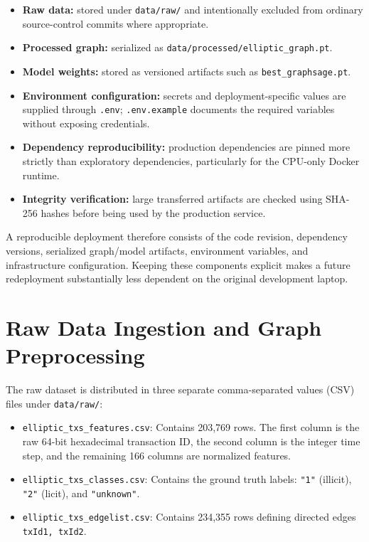 \documentclass[11pt,a4paper]{report}
\begin{document}
\begin{itemize}[leftmargin=1.5em]
  \item \textbf{Raw data:} stored under \texttt{data/raw/} and intentionally excluded from ordinary source-control commits where appropriate.
  \item \textbf{Processed graph:} serialized as \texttt{data/processed/elliptic\_graph.pt}.
  \item \textbf{Model weights:} stored as versioned artifacts such as \texttt{best\_graphsage.pt}.
  \item \textbf{Environment configuration:} secrets and deployment-specific values are supplied through \texttt{.env}; \texttt{.env.example} documents the required variables without exposing credentials.
  \item \textbf{Dependency reproducibility:} production dependencies are pinned more strictly than exploratory dependencies, particularly for the CPU-only Docker runtime.
  \item \textbf{Integrity verification:} large transferred artifacts are checked using SHA-256 hashes before being used by the production service.
\end{itemize}

A reproducible deployment therefore consists of the code revision, dependency versions, serialized graph/model artifacts, environment variables, and infrastructure configuration. Keeping these components explicit makes a future redeployment substantially less dependent on the original development laptop.

\section{Raw Data Ingestion and Graph Preprocessing}
The raw dataset is distributed in three separate comma-separated values (CSV) files under \texttt{data/raw/}:
\begin{itemize}[leftmargin=1.5em]
  \item \texttt{elliptic\_txs\_features.csv}: Contains 203,769 rows. The first column is the raw 64-bit hexadecimal transaction ID, the second column is the integer time step, and the remaining 166 columns are normalized features.
  \item \texttt{elliptic\_txs\_classes.csv}: Contains the ground truth labels: \texttt{"1"} (illicit), \texttt{"2"} (licit), and \texttt{"unknown"}.
  \item \texttt{elliptic\_txs\_edgelist.csv}: Contains 234,355 rows defining directed edges \texttt{txId1, txId2}.
\end{itemize}
\end{document}
